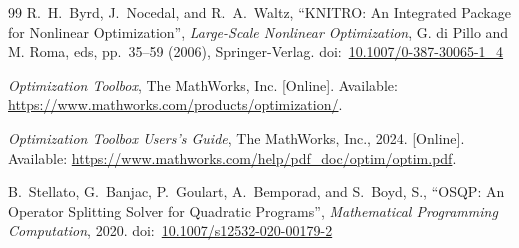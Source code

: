 \documentclass[12pt]{article}
\numberwithin{equation}{section}
\numberwithin{table}{section}
\numberwithin{figure}{section}
\begin{document}
\begin{thebibliography}{99}
R.~H.~Byrd, J.~Nocedal, and R.~A.~Waltz, ``KNITRO: An Integrated Package for Nonlinear Optimization'', \emph{Large-Scale Nonlinear Optimization}, G. di Pillo and M. Roma, eds, pp.~35--59 (2006), Springer-Verlag.
doi:~\href{https://doi.org/10.1007/0-387-30065-1_4}{10.1007/0-387-30065-1\_4}

\emph{Optimization Toolbox}, The MathWorks, Inc.
  [Online]. Available: \url{https://www.mathworks.com/products/optimization/}.

\emph{Optimization Toolbox Users's Guide}, The MathWorks, Inc., 2024.
  [Online]. Available: \url{https://www.mathworks.com/help/pdf_doc/optim/optim.pdf}.

B.~Stellato, G.~Banjac, P.~Goulart, A.~Bemporad, and S.~Boyd, S., ``{OSQP}: An Operator Splitting Solver for Quadratic Programs'', \emph{Mathematical Programming Computation}, 2020.
doi:~\href{https://doi.org/10.1007/s12532-020-00179-2}{10.1007/s12532-020-00179-2}

\end{thebibliography}
\end{document}
